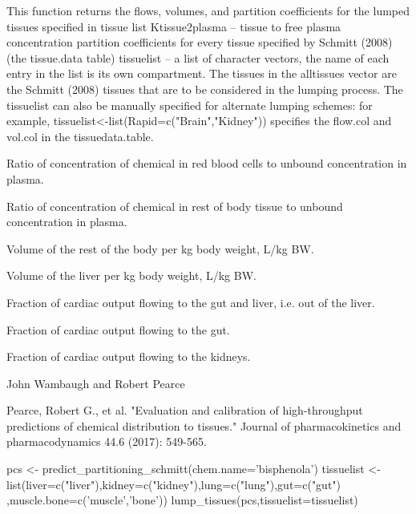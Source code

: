 \documentclass[a4paper]{book}
\begin{document}
%
\begin{Details}\relax
This function returns the flows, volumes, and partition coefficients for the
lumped tissues specified in tissue list Ktissue2plasma -- tissue to free
plasma concentration partition coefficients for every tissue specified by 
Schmitt (2008) (the tissue.data table) tissuelist -- a list of character 
vectors, the name of each entry in the list is its own compartment.
The tissues in the alltissues vector are the Schmitt (2008) tissues that are
to be considered in the lumping process. The tissuelist can also be manually
specified for alternate lumping schemes: for example,
tissuelist<-list(Rapid=c("Brain","Kidney")) specifies the flow.col and
vol.col in the tissuedata.table.
\end{Details}
%
\begin{Value}
\begin{ldescription}
\item[\code{Krbc2pu}] Ratio of concentration of chemical in red blood cells
to unbound concentration in plasma.\item[\code{Krest2pu}] Ratio of concentration
of chemical in rest of body tissue to unbound concentration in plasma.
\item[\code{Vrestc}]  Volume of the rest of the body per kg body weight, L/kg BW.
\item[\code{Vliverc}]  Volume of the liver per kg body weight, L/kg BW.
\item[\code{Qtotal.liverf}] Fraction of cardiac output flowing to the gut and
liver, i.e. out of the liver.\item[\code{Qgutf}] Fraction of cardiac output
flowing to the gut.\item[\code{Qkidneyf}] Fraction of cardiac output flowing to
the kidneys.
\end{ldescription}
\end{Value}
%
\begin{Author}\relax
John Wambaugh and Robert Pearce
\end{Author}
%
\begin{References}\relax
Pearce, Robert G., et al. "Evaluation and calibration of 
high-throughput predictions of chemical distribution to tissues." Journal of
pharmacokinetics and pharmacodynamics 44.6 (2017): 549-565.
\end{References}
%
\begin{Examples}
\begin{ExampleCode}

pcs <- predict_partitioning_schmitt(chem.name='bisphenola')
tissuelist <- list(liver=c("liver"),kidney=c("kidney"),lung=c("lung"),gut=c("gut")
,muscle.bone=c('muscle','bone'))
lump_tissues(pcs,tissuelist=tissuelist)

\end{ExampleCode}
\end{Examples}
\end{document}
